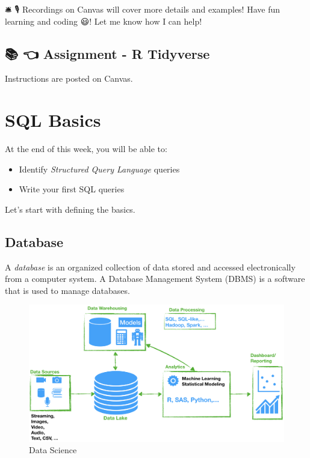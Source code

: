 \documentclass[
  letterpaper,
  DIV=11,
  numbers=noendperiod]{scrreprt}
\providecommand{\tightlist}{%
  \setlength{\itemsep}{0pt}\setlength{\parskip}{0pt}}\usepackage{longtable,booktabs,array}
\begin{document}
🛎 🎙️ Recordings on Canvas will cover more details and examples! Have fun
learning and coding 😃! Let me know how I can help!

\hypertarget{assignment---r-tidyverse}{%
\section*{📚 👈 Assignment - R
Tidyverse}\label{assignment---r-tidyverse}}


Instructions are posted on Canvas.

\hypertarget{sql-basics}{%
\chapter*{SQL Basics}\label{sql-basics}}


At the end of this week, you will be able to:

\begin{itemize}
\tightlist
\item
  Identify \emph{Structured Query Language} queries
\item
  Write your first SQL queries
\end{itemize}

Let's start with defining the basics.

\hypertarget{database}{%
\section*{Database}\label{database}}


A \emph{database} is an organized collection of data stored and accessed
electronically from a computer system. A Database Management System
(DBMS) is a software that is used to manage databases.

\begin{figure}

{\centering \includegraphics{img/DSWorkflow.png}

}

\caption{Data Science}

\end{figure}
\end{document}
